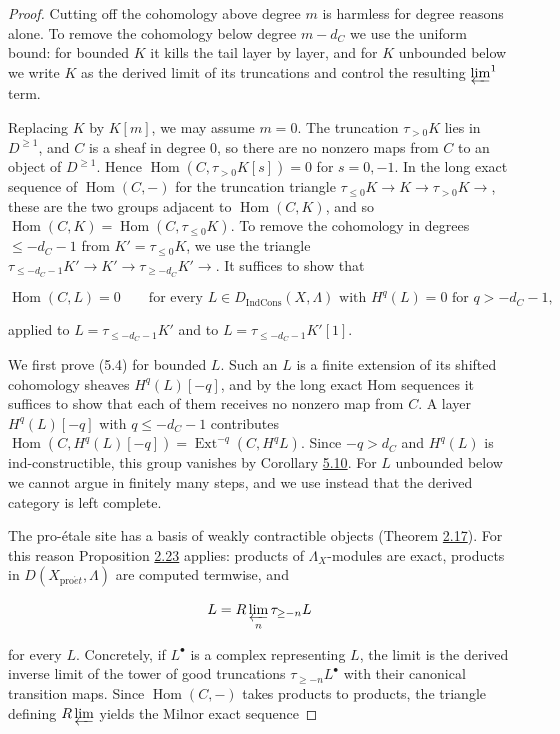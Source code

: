 \documentclass[11pt]{article}
\providecommand{\Dic}{}\renewcommand{\Dic}{D_{\IndCons}}
\providecommand{\Ext}{}\renewcommand{\Ext}{\operatorname{Ext}}
\providecommand{\Hom}{}\renewcommand{\Hom}{\operatorname{Hom}}
\providecommand{\IndCons}{}\renewcommand{\IndCons}{\operatorname{IndCons}}
\begin{document}
\begin{proof}[{Proof}]\label{bp444}%
Cutting off the cohomology above degree \(m\) is harmless for degree reasons alone. To remove the cohomology below degree \(m-d_C\) we use the uniform bound: for bounded \(K\) it kills the tail layer by layer, and for \(K\) unbounded below we write \(K\) as the derived limit of its truncations and control the resulting \(\varprojlim^1\) term.

Replacing \(K\) by \(K[m]\), we may assume \(m=0\). The truncation \(\tau_{>0}K\) lies in \(D^{\geq1}\), and \(C\) is a sheaf in degree \(0\), so there are no nonzero maps from \(C\) to an object of \(D^{\geq1}\). Hence \(\Hom(C,\tau_{>0}K[s])=0\) for \(s=0,-1\). In the long exact sequence of \(\Hom(C,-)\) for the truncation triangle \(\tau_{\leq0}K\to K\to\tau_{>0}K\to\), these are the two groups adjacent to \(\Hom(C,K)\), and so \(\Hom(C,K)=\Hom(C,\tau_{\leq0}K)\). To remove the cohomology in degrees \(\leq-d_C-1\) from \(K'=\tau_{\leq0}K\), we use the triangle \(\tau_{\leq-d_C-1}K'\to K'\to\tau_{\geq-d_C}K'\to\). It suffices to show that

\[
\Hom(C,L)=0\qquad
\text{for every }L\in\Dic(X,\Lambda)\text{ with }H^q(L)=0\text{ for }q>-d_C-1,
\tag{5.4}
\]

applied to \(L=\tau_{\leq-d_C-1}K'\) and to \(L=\tau_{\leq-d_C-1}K'[1]\).

We first prove (5.4) for bounded \(L\). Such an \(L\) is a finite extension of its shifted cohomology sheaves \(H^q(L)[-q]\), and by the long exact Hom sequences it suffices to show that each of them receives no nonzero map from \(C\). A layer \(H^q(L)[-q]\) with \(q\leq-d_C-1\) contributes \(\Hom(C,H^q(L)[-q])=\Ext^{-q}(C,H^qL)\). Since \(-q>d_C\) and \(H^q(L)\) is ind-constructible, this group vanishes by Corollary \hyperref[bp436]{5.10}. For \(L\) unbounded below we cannot argue in finitely many steps, and we use instead that the derived category is left complete.

The pro-étale site has a basis of weakly contractible objects (Theorem \hyperref[bp51]{2.17}). For this reason Proposition \hyperref[bp68]{2.23} applies: products of \(\Lambda_X\)-modules are exact, products in \(D(X_{\mathrm{pro}\acute{e}t},\Lambda)\) are computed termwise, and

\[
L=R\varprojlim_n\tau_{\geq-n}L
\]

for every \(L\). Concretely, if \(L^\bullet\) is a complex representing \(L\), the limit is the derived inverse limit of the tower of good truncations \(\tau_{\geq-n}L^\bullet\) with their canonical transition maps. Since \(\Hom(C,-)\) takes products to products, the triangle defining \(R\varprojlim\) yields the Milnor exact sequence


\end{proof}
\end{document}
